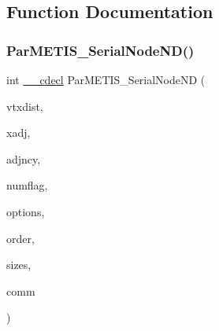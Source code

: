 \subsection{Function Documentation}
\mbox{\label{a00843_a8bd1a6399ac304da6616cb5329304df6}} 
\subsubsection{\texorpdfstring{Par\+M\+E\+T\+I\+S\+\_\+\+Serial\+Node\+N\+D()}{ParMETIS\_SerialNodeND()}}
{\footnotesize\ttfamily int \hyperlink{a00843_a238347d7669f8f1e9c83bfe63a2730c4}{\+\_\+\+\_\+cdecl} Par\+M\+E\+T\+I\+S\+\_\+\+Serial\+Node\+ND (\begin{DoxyParamCaption}\item[{\hyperlink{a00876_aaa5262be3e700770163401acb0150f52}{idx\+\_\+t} $\ast$}]{vtxdist,  }\item[{\hyperlink{a00876_aaa5262be3e700770163401acb0150f52}{idx\+\_\+t} $\ast$}]{xadj,  }\item[{\hyperlink{a00876_aaa5262be3e700770163401acb0150f52}{idx\+\_\+t} $\ast$}]{adjncy,  }\item[{\hyperlink{a00876_aaa5262be3e700770163401acb0150f52}{idx\+\_\+t} $\ast$}]{numflag,  }\item[{\hyperlink{a00876_aaa5262be3e700770163401acb0150f52}{idx\+\_\+t} $\ast$}]{options,  }\item[{\hyperlink{a00876_aaa5262be3e700770163401acb0150f52}{idx\+\_\+t} $\ast$}]{order,  }\item[{\hyperlink{a00876_aaa5262be3e700770163401acb0150f52}{idx\+\_\+t} $\ast$}]{sizes,  }\item[{M\+P\+I\+\_\+\+Comm $\ast$}]{comm }\end{DoxyParamCaption})}

